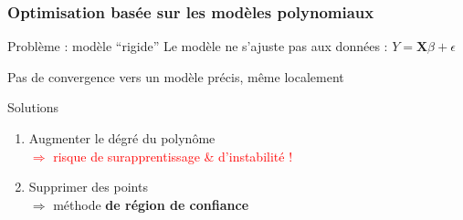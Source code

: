 \documentclass{beamer}
\begin{document}
\begin{frame}
\frametitle{Optimisation basée sur les modèles polynomiaux}
\begin{block}{Problème : modèle ``rigide''}
Le modèle ne s'ajuste pas aux données : 
$ Y = \mathbf{X} \beta + \epsilon $

Pas de convergence vers un modèle précis, même localement
\end{block}

\begin{exampleblock}{Solutions}
\begin{enumerate}
 \item Augmenter le dégré du polynôme \\
 \textcolor{red}{$\Rightarrow$ risque de surapprentissage \& d'instabilité !}
 \item Supprimer des points \\
 $\Rightarrow$ méthode \textbf{de région de confiance}
\end{enumerate}
\end{exampleblock}
\end{frame}
\end{document}
